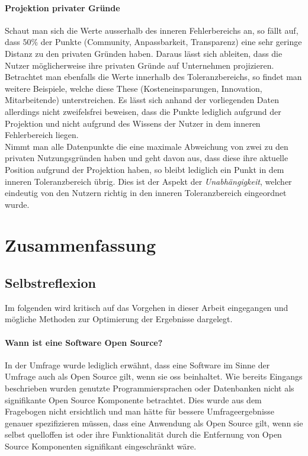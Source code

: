 \documentclass[a4paper]{article}
\begin{document}
                \paragraph{Projektion privater Gründe}
                    Schaut man sich die Werte ausserhalb des inneren Fehlerbereichs an, so fällt auf, dass $50 \%$ der Punkte ({\scriptsize Community, Anpassbarkeit, Transparenz}) eine sehr geringe Distanz zu den privaten Gründen haben. Daraus lässt sich ableiten, dass die Nutzer möglicherweise ihre privaten Gründe auf Unternehmen projizieren.\\
                    Betrachtet man ebenfalls die Werte innerhalb des Toleranzbereichs, so findet man weitere Beispiele, welche diese These ({\scriptsize Kosteneinsparungen, Innovation, Mitarbeitende}) unterstreichen. Es lässt sich anhand der vorliegenden Daten allerdings nicht zweifelsfrei beweisen, dass die Punkte lediglich aufgrund der Projektion und nicht aufgrund des Wissens der Nutzer in dem inneren Fehlerbereich liegen.\\
                    Nimmt man alle Datenpunkte die eine maximale Abweichung von zwei zu den privaten Nutzungsgründen haben und geht davon aus, dass diese ihre aktuelle Position aufgrund der Projektion haben, so bleibt lediglich ein Punkt in dem inneren Toleranzbereich übrig. Dies ist der Aspekt der \emph{Unabhängigkeit}, welcher eindeutig von den Nutzern richtig in den inneren Toleranzbereich eingeordnet wurde.
    
    \clearpage
    \section{Zusammenfassung}
        \subsection{Selbstreflexion}
            Im folgenden wird kritisch auf das Vorgehen in dieser Arbeit eingegangen und mögliche Methoden zur Optimierung der Ergebnisse dargelegt.
            \paragraph{Wann ist eine Software Open Source?}
                In der Umfrage wurde lediglich erwähnt, dass eine Software im Sinne der Umfrage auch als Open Source gilt, wenn sie \gls{oss} beinhaltet. Wie bereits Eingangs beschrieben wurden genutzte Programmiersprachen oder Datenbanken nicht als signifikante Open Source Komponente betrachtet. Dies wurde aus dem Fragebogen nicht ersichtlich und man hätte für bessere Umfrageergebnisse genauer spezifizieren müssen, dass eine Anwendung als Open Source gilt, wenn sie selbst quelloffen ist oder ihre Funktionalität durch die Entfernung von Open Source Komponenten signifikant eingeschränkt wäre.
                
\end{document}
